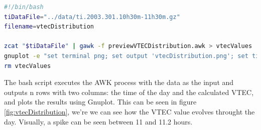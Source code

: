 \begin{lstlisting}[language=Bash, caption=Bash script to execute the procedures]
#!/bin/bash
tiDataFile="../data/ti.2003.301.10h30m-11h30m.gz"
filename=vtecDistribution

zcat "$tiDataFile" | gawk -f previewVTECDistribution.awk > vtecValues
gnuplot -e "set terminal png; set output 'vtecDistribution.png'; set title 'VTEC Distribution'; set xlabel 'Time of the day (hours)'; set ylabel 'VTEC'; set grid; plot \"vtecValues\" using 1:2 with point"
rm vtecValues
\end{lstlisting}
\clearpage

The bash script executes the AWK process with the data as the input and outputs n rows with two columns: the time of the day and the calculated VTEC, and plots the results using Gnuplot.
This can be seen in figure \ref{fig:vtecDistribution}, we're we can see how the VTEC value evolves throught the day. Visually, a spike can be seen between 11 and 11.2 hours.

